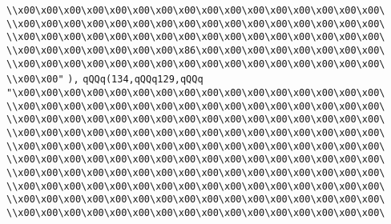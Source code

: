 \verb|\\x00\x00\x00\x00\x00\x00\x00\x00\x00\x00\x00\x00\x00\x00\x00\x00\|\newline
\verb|\\x00\x00\x00\x00\x00\x00\x00\x00\x00\x00\x00\x00\x00\x00\x00\x00\|\newline
\verb|\\x00\x00\x00\x00\x00\x00\x00\x00\x00\x00\x00\x00\x00\x00\x00\x00\|\newline
\verb|\\x00\x00\x00\x00\x00\x00\x00\x86\x00\x00\x00\x00\x00\x00\x00\x00\|\newline
\verb|\\x00\x00\x00\x00\x00\x00\x00\x00\x00\x00\x00\x00\x00\x00\x00\x00\|\newline
\verb|\\x00\x00"|\newline
\verb|),|\newline
\verb|qQQq(134,qQQq129,qQQq|\newline
\verb|"\x00\x00\x00\x00\x00\x00\x00\x00\x00\x00\x00\x00\x00\x00\x00\x00\|\newline
\verb|\\x00\x00\x00\x00\x00\x00\x00\x00\x00\x00\x00\x00\x00\x00\x00\x00\|\newline
\verb|\\x00\x00\x00\x00\x00\x00\x00\x00\x00\x00\x00\x00\x00\x00\x00\x00\|\newline
\verb|\\x00\x00\x00\x00\x00\x00\x00\x00\x00\x00\x00\x00\x00\x00\x00\x00\|\newline
\verb|\\x00\x00\x00\x00\x00\x00\x00\x00\x00\x00\x00\x00\x00\x00\x00\x00\|\newline
\verb|\\x00\x00\x00\x00\x00\x00\x00\x00\x00\x00\x00\x00\x00\x00\x00\x00\|\newline
\verb|\\x00\x00\x00\x00\x00\x00\x00\x00\x00\x00\x00\x00\x00\x00\x00\x00\|\newline
\verb|\\x00\x00\x00\x00\x00\x00\x00\x00\x00\x00\x00\x00\x00\x00\x00\x00\|\newline
\verb|\\x00\x00\x00\x00\x00\x00\x00\x00\x00\x00\x00\x00\x00\x00\x00\x00\|\newline
\verb|\\x00\x00\x00\x00\x00\x00\x00\x00\x00\x00\x00\x00\x00\x00\x00\x00\|\newline

